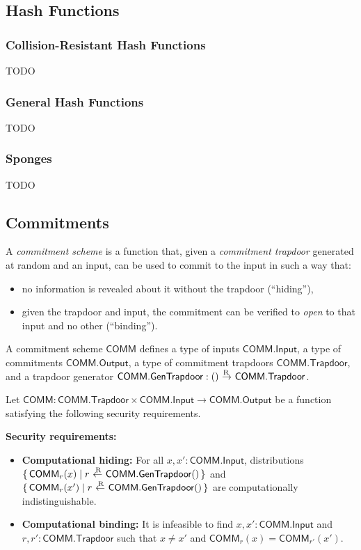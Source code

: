 \documentclass{article}
\newcommand{\callout}[1]{\vspace{2ex plus 2pt minus 2pt}\noindent\textbf{#1}\hspace{1em}}
\newenvironment{securityrequirements}{\callout{Security requirements:}\begin{itemize}}{\end{itemize}}
\newcommand{\typecolon}{:}
\newcommand{\clasp}[3][0pt]{\stackengine{0pt}{#3}{\kern#1#2}{O}{c}{F}{F}{L}}
\newcommand{\rightarrowR}{\mathop{\clasp[-0.18em]{\raisebox{1.15ex}{\scriptsize R}}{$\,\rightarrow\,$}}}
\newcommand{\leftarrowR}{\mathop{\clasp[0.15em]{\raisebox{1.15ex}{\scriptsize R}}{$\,\leftarrow\,$}}}
\newcommand{\CommitAlg}{\mathsf{COMM}}
\newcommand{\Commit}[1]{\CommitAlg_{#1}}
\newcommand{\CommitTrapdoor}{\CommitAlg\mathsf{.Trapdoor}}
\newcommand{\CommitGenTrapdoor}{\CommitAlg\mathsf{.GenTrapdoor}}
\newcommand{\CommitInput}{\CommitAlg\mathsf{.Input}}
\newcommand{\CommitOutput}{\CommitAlg\mathsf{.Output}}
\begin{document}
\subsection{Hash Functions} \label{hash}

\subsubsection{Collision-Resistant Hash Functions} \label{crhf}

TODO


\subsubsection{General Hash Functions} \label{genhash}

TODO


\subsubsection{Sponges} \label{sponge}

TODO


\subsection{Commitments} \label{commitment}

A \emph{commitment scheme} is a function that, given a \emph{commitment trapdoor} generated at
random and an input, can be used to commit to the input in such a way that:

\begin{itemize}
  \item no information is revealed about it without the trapdoor (``hiding''),
  \item given the trapdoor and input, the commitment can be verified to \emph{open}
        to that input and no other (``binding'').
\end{itemize}

A commitment scheme $\CommitAlg$ defines a type of inputs $\CommitInput$,
a type of commitments $\CommitOutput$, a type of commitment trapdoors
$\CommitTrapdoor$, and a trapdoor generator $\CommitGenTrapdoor \typecolon () \rightarrowR \CommitTrapdoor$.

Let $\CommitAlg \typecolon \CommitTrapdoor \times \CommitInput \rightarrow \CommitOutput$
be a function satisfying the following security requirements.

\begin{securityrequirements}[leftmargin=2em]
  \item \textbf{Computational hiding:} For all $x, x' \typecolon \CommitInput$,
        distributions $\{\, \Commit{r}(x) \;|\; r \leftarrowR \CommitGenTrapdoor() \,\}$
        and $\{\, \Commit{r}(x') \;|\; r \leftarrowR \CommitGenTrapdoor() \,\}$ are
        computationally indistinguishable.
  \item \textbf{Computational binding:} It is infeasible to find
        $x, x' \typecolon \CommitInput$ and
        $r, r' \typecolon \CommitTrapdoor$
        such that $x \neq x'$ and $\Commit{r}(x) = \Commit{r'}(x')$.
\end{securityrequirements}
\end{document}
